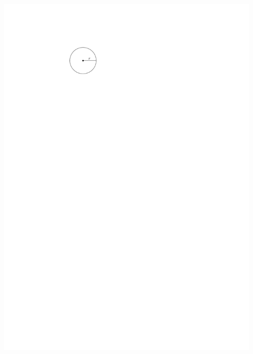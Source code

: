 \documentclass[12pt,twoside]{article}
\makeatletter
\def\emptycleardoublepage{\clearpage\if@twoside \ifodd\c@page\else
\thispagestyle{empty}%
\hbox{}\newpage\if@twocolumn\hbox{}\newpage\fi\fi\fi}
\makeatother
\begin{document}
\begin{multicols}{2}
\begin{enumerate}
\includegraphics[scale = 0.8]{circle}
 \end{enumerate}\end{multicols}\emptycleardoublepage 
\end{document}
